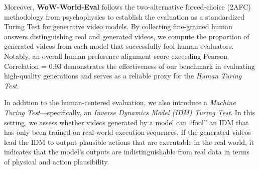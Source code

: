 Moreover, \textbf{WoW-World-Eval} follows the two-alternative forced-choice (2AFC)~\cite{fechner1860elemente} methodology from psychophysics to establish the evaluation as a standardized Turing Test for generative video models. By collecting fine-grained human answers distinguishing real and generated videos, we compute the proportion of generated videos from each model that successfully fool human evaluators. Notably, an overall human preference alignment score exceeding Pearson Correlation = 0.93 demonstrates the effectiveness of our benchmark in evaluating high-quality generations and serves as a reliable proxy for the \textit{Human Turing Test}.

In addition to the human-centered evaluation, we also introduce a \textit{Machine Turing Test}—specifically, an \textit{Inverse Dynamics Model (IDM) Turing Test}. In this setting, we assess whether videos generated by a model can “fool” an IDM that has only been trained on real-world execution sequences. If the generated videos lead the IDM to output plausible actions that are executable in the real world, it indicates that the model's outputs are indistinguishable from real data in terms of physical and action plausibility.

